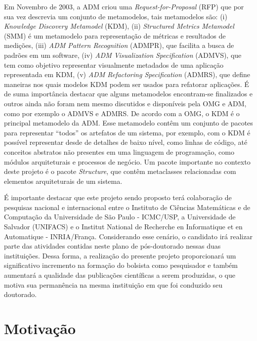 \documentclass[12pt]{article}
\begin{document}
Em Novembro de 2003, a ADM criou uma \textit{Request-for-Proposal} (RFP) que por sua vez descrevia um conjunto de metamodelos, tais metamodelos são: (i) \textit{Knowledge Discovery Metamodel} (KDM), (ii) \textit{Structured Metrics Metamodel} (SMM) é um metamodelo para representação de métricas e resultados de medições, (iii) \textit{ADM Pattern Recognition} (ADMPR), que facilita a busca de padrões em um software, (iv) \textit{ADM Visualization Specification} (ADMVS), que tem como objetivo representar visualmente metadados de uma aplicação representada em KDM, (v) \textit{ADM Refactoring Specification} (ADMRS), que define maneiras nos quais modelos KDM podem ser usados para refatorar aplicações. É de suma importância destacar que alguns metamodelos encontram-se finalizados e outros ainda não foram nem mesmo discutidos e disponíveis pela OMG e ADM, como por exemplo o ADMVS e ADMRS. De acordo com a OMG, o KDM é o principal metamodelo da ADM. Esse metamodelo contêm um conjunto de pacotes para representar ``todos'' os artefatos de um sistema, por exemplo, com o KDM é possível representar desde de detalhes de baixo nível, como linhas de código, até conceitos abstratos não presentes em uma linguagem de programação, como módulos arquiteturais e processos de negócio. Um pacote importante no contexto deste projeto é o pacote \textit{Structure}, que contêm metaclasses relacionadas com elementos arquiteturais de um sistema.

É importante destacar que este projeto sendo proposto terá colaboração de pesquisas nacional e internacional entre o Instituto de Ciências Matemáticas e de Computação da Universidade de São Paulo - ICMC/USP, a Universidade de Salvador (UNIFACS) e o Institut National de Recherche en Informatique et en Automatique - INRIA/França. Considerando esse cenário, o candidato irá realizar parte das atividades contidas neste plano de pós-doutorado nessas duas instituições. Dessa forma, a realização do presente projeto proporcionará um significativo incremento na formação do bolsista como pesquisador e também aumentará a qualidade das publicações científicas a serem produzidas, o que motiva sua permanência na mesma instituição em que foi conduzido seu doutorado.


\section{Motivação}
\end{document}
